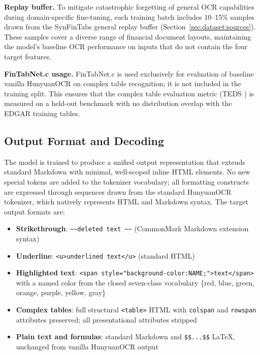 \documentclass[10pt,twocolumn]{article}
\begin{document}
\textbf{Replay buffer.} To mitigate catastrophic forgetting of general OCR
capabilities during domain-specific fine-tuning, each training batch includes
10--15\% samples drawn from the SynFinTabs general replay buffer
(Section~\ref{sec:dataset:sources}). These samples cover a diverse range of
financial document layouts, maintaining the model's baseline OCR performance on
inputs that do not contain the four target features.

\textbf{FinTabNet.c usage.} FinTabNet.c \cite{smock2023fintabnetc} is used
exclusively for evaluation of baseline vanilla HunyuanOCR on complex table
recognition; it is not included in the training split. This ensures that the
complex table evaluation metric (TEDS \cite{zhong2020teds}) is measured on a
held-out benchmark with no distribution overlap with the EDGAR training tables.

\subsection{Output Format and Decoding}
\label{sec:method:output}

The model is trained to produce a unified output representation that extends
standard Markdown with minimal, well-scoped inline HTML elements. No new special
tokens are added to the tokenizer vocabulary; all formatting constructs are
expressed through sequences drawn from the standard HunyuanOCR tokenizer, which
natively represents HTML and Markdown syntax. The target output formats are:

\begin{itemize}
  \item \textbf{Strikethrough}:
    \texttt{\textasciitilde\textasciitilde{}deleted text%
    \textasciitilde\textasciitilde}
    (CommonMark Markdown extension syntax)
  \item \textbf{Underline}: \texttt{<u>underlined text</u>} (standard HTML)
  \item \textbf{Highlighted text}: \texttt{<span style="background-color:NAME;">text</span>}
    with a named color from the closed seven-class vocabulary
    \{red, blue, green, orange, purple, yellow, gray\}
  \item \textbf{Complex tables}: full structural \texttt{<table>} HTML with
    \texttt{colspan} and \texttt{rowspan} attributes preserved; all
    presentational attributes stripped
  \item \textbf{Plain text and formulas}: standard Markdown and
    \texttt{\$\$...\$\$} LaTeX, unchanged from vanilla HunyuanOCR output
\end{itemize}
\end{document}

